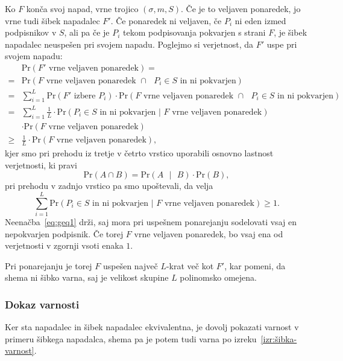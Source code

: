 \documentclass[isrm2, tisk]{fmfdelo}
\begin{document}
\begin{dokaz}
\begin{itemize}
    \end{itemize}

    Ko $F$ konča svoj napad, vrne trojico $(\sigma, m, S)$. Če je to veljaven ponaredek, jo vrne tudi
    šibek napadalec $F'$. Če ponaredek ni veljaven, če $P_i$ ni eden izmed podpisnikov v $S$, ali pa
    če je $P_i$ tekom podpisovanja pokvarjen s strani $F$, je šibek napadalec neuspešen pri svojem napadu.
    Poglejmo si verjetnost, da $F'$ uspe pri svojem napadu:
    \begin{align*}
          &\text{Pr}(\text{$F'$ vrne veljaven ponaredek}) = \\
        = &\text{Pr}(\text{$F$ vrne veljaven ponaredek } \cap \text{ $P_i \in S$ in ni pokvarjen}) \\
        = &\sum_{i=1}^L \text{Pr}(\text{$F'$ izbere $P_i$}) \cdot 
            \text{Pr}(\text{$F$ vrne veljaven ponaredek } \cap \text{ $P_i \in S$ in ni pokvarjen}) \\
        = &\sum_{i=1}^L \frac{1}{L} \cdot 
            \text{Pr}(\text{$P_i \in S$ in ni pokvarjen | $F$ vrne veljaven ponaredek}) \\
          &\cdot \text{Pr}(\text{$F$ vrne veljaven ponaredek}) \\
        \geq &\frac{1}{L} \cdot \text{Pr}(\text{$F$ vrne veljaven ponaredek}),
    \end{align*}
    kjer smo pri prehodu iz tretje v četrto vrstico uporabili osnovno lastnost verjetnosti, ki pravi
    $$
    \text{Pr}(A \cap B) = \text{Pr}(A \text{ }|\text{ } B) \cdot \text{Pr}(B),
    $$
    pri prehodu v zadnjo vrstico pa smo upoštevali, da velja
    \begin{equation}
    \label{eq:geq1}
    \sum_{i=1}^L \text{Pr}(\text{$P_i \in S$ in ni pokvarjen | $F$ vrne veljaven ponaredek}) \geq 1.
    \end{equation}
    Neenačba~\eqref{eq:geq1} drži, saj mora pri uspešnem ponarejanju sodelovati vsaj en nepokvarjen
    podpisnik. Če torej $F$ vrne veljaven ponaredek, bo vsaj ena od verjetnosti v zgornji vsoti enaka $1$.

    Pri ponarejanju je torej $F$ uspešen največ $L$-krat več kot $F'$, kar pomeni, da shema ni šibko
    varna, saj je velikost skupine $L$ polinomsko omejena.
\end{dokaz}

\subsubsection{Dokaz varnosti}
Ker sta napadalec in šibek napadalec ekvivalentna, je dovolj pokazati varnost v primeru šibkega
napadalca, shema pa je potem tudi varna po izreku~\ref{izr:šibka-varnost}.
\end{document}
